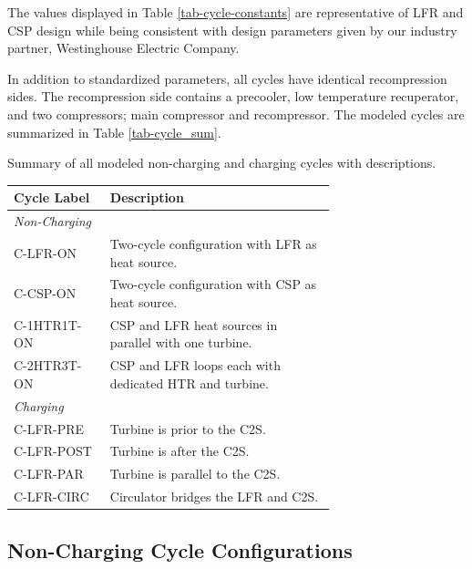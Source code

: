 \begin{paracol}{2}
The values displayed in Table \ref{tab-cycle-constants} are representative of LFR and CSP design while being consistent with design parameters given by our industry partner, Westinghouse Electric Company. 


In addition to standardized parameters, all cycles have identical recompression sides. The recompression side contains a precooler, low temperature recuperator, and two compressors; main compressor and recompressor. 
The modeled cycles are summarized in Table \ref{tab-cycle_sum}.

\begin{specialtable}[H] 
    \caption{Summary of all modeled non-charging and charging cycles with descriptions. \label{tab-cycle_sum}}
    \begin{tabular}{lL{0.7\linewidth}}
    \toprule
    \textbf{Cycle Label} & \textbf{Description}\\
    \midrule
    \textit{Non-Charging}\\
    C-LFR-ON & Two-cycle configuration with LFR as heat source.\\
    C-CSP-ON & Two-cycle configuration with CSP as heat source.\\
    C-1HTR1T-ON & CSP and LFR heat sources in parallel with one turbine.\\
    C-2HTR3T-ON & CSP and LFR loops each with dedicated HTR and turbine.\\
    \midrule
    \textit{Charging}\\
    C-LFR-PRE & Turbine is prior to the C2S.\\
    C-LFR-POST & Turbine is after the C2S.\\
    C-LFR-PAR & Turbine is parallel to the C2S.\\
    C-LFR-CIRC & Circulator bridges the LFR and C2S.\\
    \bottomrule
    \end{tabular}
\end{specialtable}

\subsection{Non-Charging Cycle Configurations} 


\end{paracol}
